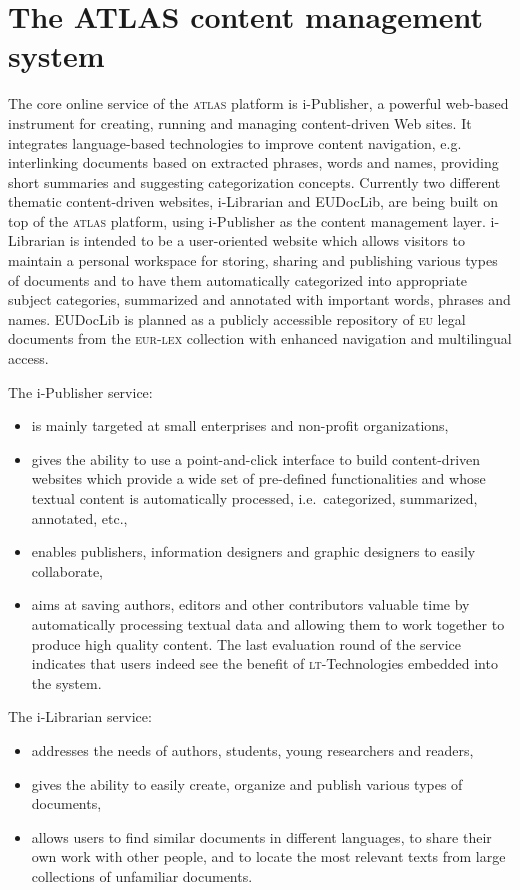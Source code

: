 \documentclass[output=paper]{LSP/langsci}
\begin{document}
\section{The ATLAS content management system}\label{sec:dumavertan:2}

The core online service of the \textsc{atlas} platform is i-Publisher, a powerful web-based instrument for creating, running and managing content-driven Web sites. It integrates language-based technologies to improve content navigation, e.g. interlinking documents based on extracted phrases, words and names, providing short summaries and suggesting categorization concepts. Currently two different thematic content-driven websites, i-Librarian and EUDocLib, are being built on top of the \textsc{atlas} platform, using i-Publisher as the content management layer. i-Librarian is intended to be a user-oriented website which allows visitors to maintain a personal workspace for storing, sharing and publishing various types of documents and to have them automatically categorized into appropriate subject categories, summarized and annotated with important words, phrases and names. EUDocLib is planned as a publicly accessible repository of \textsc{eu} legal documents from the \textsc{eur-lex} collection with enhanced navigation and multilingual access. 

The i-Publisher service:

\begin{itemize}
\item 
is mainly targeted at small enterprises and non-profit organizations, 
\item 
gives the ability to use a point-and-click interface to build content-driven websites which provide a wide set of pre-defined functionalities and whose textual content is automatically processed, i.e.\ categorized, summarized, annotated, etc., 
\item 
enables publishers, information designers and graphic designers to easily collaborate, 
\item 
aims at saving authors, editors and other contributors valuable time by automatically processing textual data and allowing them to work together to produce high quality content. The last evaluation round of the service indicates that users indeed see the benefit of \textsc{lt}-Technologies embedded into the system.
\end{itemize}

The i-Librarian service:

\begin{itemize}
\item 
addresses the needs of authors, students, young researchers and readers, 
\item 
gives the ability to easily create, organize and publish various types of documents, 
\item 
allows users to find similar documents in different languages, to share their own work with other people, and to locate the most relevant texts from large collections of unfamiliar documents.
\end{itemize}
\end{document}
